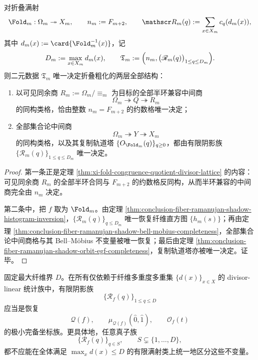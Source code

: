 \begin{theorem}\label{thm:conclusion-fold-ramanujan-shadow-divisor-partition-two-layer-rigidity}
对折叠满射
\[
\Fold_m:\Omega_m\twoheadrightarrow X_m,
\qquad
n_m:=F_{m+2},
\qquad
\mathscr R_m(q):=\sum_{x\in X_m}c_q(d_m(x)),
\]
其中 \(d_m(x):=\card{\Fold_m^{-1}(x)}\)，记
\[
D_m:=\max_{x\in X_m}d_m(x),
\qquad
\mathfrak T_m:=\Bigl(n_m,\bigl(\mathscr R_m(q)\bigr)_{1\le q\le D_m}\Bigr).
\]
则二元数据 \(\mathfrak T_m\) 唯一决定折叠粗化的两层全部结构：
\begin{enumerate}
\normalfont
  \item 以可见同余商 \(R_m:=\Omega_m/\!\equiv_m\) 为目标的全部半环兼容中间商
  \[
  \Omega_m\twoheadrightarrow Q\twoheadrightarrow R_m
  \]
  的同构类格，恰由整数 \(n_m=F_{m+2}\) 的约数格唯一决定；
  \item 全部集合论中间商
  \[
  \Omega_m\twoheadrightarrow Y\twoheadrightarrow X_m
  \]
  的同构类格，以及其复制轨道塔 \(\{O_{\Fold_m}(q)\}_{q\ge 0}\)，都由有限阴影族 \(\{\mathscr R_m(q)\}_{1\le q\le D_m}\) 唯一决定。
\end{enumerate}
\end{theorem}
\begin{proof}
第一条正是定理 \ref{thm:xi-fold-congruence-quotient-divisor-lattice} 的内容：可见同余商 \(R_m\) 的全部半环合同与 \(F_{m+2}\) 的约数格反同构，从而半环兼容的中间商完全由 \(n_m\) 决定。

第二条中，把 \(f\) 取为 \(\Fold_m\)。由定理 \ref{thm:conclusion-fiber-ramanujan-shadow-histogram-inversion}，\(\{\mathscr R_m(q)\}_{q\le D_m}\) 唯一恢复纤维直方图 \(\{h_m(s)\}\)；再由定理 \ref{thm:conclusion-fiber-ramanujan-shadow-bell-mobius-completeness}，全部集合论中间商格与其 Bell--Möbius 不变量被唯一恢复；最后由定理 \ref{thm:conclusion-fiber-ramanujan-shadow-orbit-egf-completeness}，复制轨道塔亦被唯一决定。证毕。
\end{proof}

\begin{conjecture}\label{conj:conclusion-fiber-ramanujan-shadow-minimal-completeness}
固定最大纤维界 \(D\)。在所有仅依赖于纤维多重度多重集 \(\{d(x)\}_{x\in X}\) 的 divisor-linear 统计族中，有限阴影族
\[
\{\mathscr R_f(q)\}_{1\le q\le D}
\]
应当是恢复
\[
\mathcal Q(f),
\qquad
\mu_{\mathcal Q(f)}(\hat 0,\hat 1),
\qquad
\mathcal O_f(t)
\]
的极小完备坐标族。更具体地，任意真子族
\[
\{\mathscr R_f(q)\}_{q\in S},
\qquad
S\subsetneq \{1,\dots,D\},
\]
都不应能在全体满足 \(\max_x d(x)\le D\) 的有限满射类上统一地区分这些不变量。
\end{conjecture}
